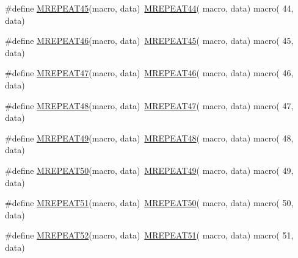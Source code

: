 \begin{DoxyCompactItemize}
\item 
\#define \mbox{\hyperlink{group__group__sam0__utils__mrepeat_ga98af56829d52d667c77077948d324447}{M\+R\+E\+P\+E\+A\+T45}}(macro,  data)~\mbox{\hyperlink{group__group__sam0__utils__mrepeat_ga2b24fe07a9548203e922430255d5dba1}{M\+R\+E\+P\+E\+A\+T44}}( macro, data)   macro( 44, data)
\item 
\#define \mbox{\hyperlink{group__group__sam0__utils__mrepeat_gaaa292eca5c75fc09e042a941b69e077c}{M\+R\+E\+P\+E\+A\+T46}}(macro,  data)~\mbox{\hyperlink{group__group__sam0__utils__mrepeat_ga98af56829d52d667c77077948d324447}{M\+R\+E\+P\+E\+A\+T45}}( macro, data)   macro( 45, data)
\item 
\#define \mbox{\hyperlink{group__group__sam0__utils__mrepeat_ga31b4cab8f91fc3ca6dbb6d4d501edc3c}{M\+R\+E\+P\+E\+A\+T47}}(macro,  data)~\mbox{\hyperlink{group__group__sam0__utils__mrepeat_gaaa292eca5c75fc09e042a941b69e077c}{M\+R\+E\+P\+E\+A\+T46}}( macro, data)   macro( 46, data)
\item 
\#define \mbox{\hyperlink{group__group__sam0__utils__mrepeat_ga37c9d35afe9f5aa1eb274a590afeae75}{M\+R\+E\+P\+E\+A\+T48}}(macro,  data)~\mbox{\hyperlink{group__group__sam0__utils__mrepeat_ga31b4cab8f91fc3ca6dbb6d4d501edc3c}{M\+R\+E\+P\+E\+A\+T47}}( macro, data)   macro( 47, data)
\item 
\#define \mbox{\hyperlink{group__group__sam0__utils__mrepeat_ga0b8f49d449884ed9753850305fd1e31f}{M\+R\+E\+P\+E\+A\+T49}}(macro,  data)~\mbox{\hyperlink{group__group__sam0__utils__mrepeat_ga37c9d35afe9f5aa1eb274a590afeae75}{M\+R\+E\+P\+E\+A\+T48}}( macro, data)   macro( 48, data)
\item 
\#define \mbox{\hyperlink{group__group__sam0__utils__mrepeat_gac25633a97dd40a5eec980d04c51d960d}{M\+R\+E\+P\+E\+A\+T50}}(macro,  data)~\mbox{\hyperlink{group__group__sam0__utils__mrepeat_ga0b8f49d449884ed9753850305fd1e31f}{M\+R\+E\+P\+E\+A\+T49}}( macro, data)   macro( 49, data)
\item 
\#define \mbox{\hyperlink{group__group__sam0__utils__mrepeat_ga6818ebdd66a3249479701fa34a7994e8}{M\+R\+E\+P\+E\+A\+T51}}(macro,  data)~\mbox{\hyperlink{group__group__sam0__utils__mrepeat_gac25633a97dd40a5eec980d04c51d960d}{M\+R\+E\+P\+E\+A\+T50}}( macro, data)   macro( 50, data)
\item 
\#define \mbox{\hyperlink{group__group__sam0__utils__mrepeat_ga321d36cd49e5f6ca5dc7066e7913e634}{M\+R\+E\+P\+E\+A\+T52}}(macro,  data)~\mbox{\hyperlink{group__group__sam0__utils__mrepeat_ga6818ebdd66a3249479701fa34a7994e8}{M\+R\+E\+P\+E\+A\+T51}}( macro, data)   macro( 51, data)

\end{DoxyCompactItemize}
